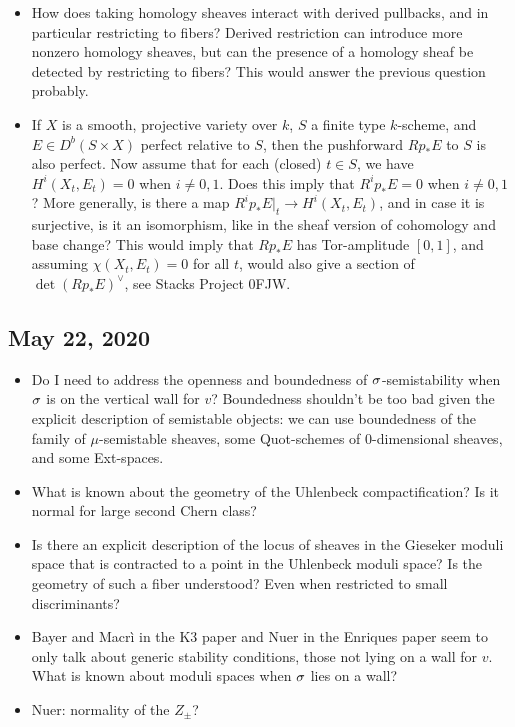 \documentclass[letterpaper,10pt]{article}
\begin{document}
\begin{itemize}
    \item How does taking homology sheaves interact with derived pullbacks, and in particular restricting to fibers? Derived restriction can introduce more nonzero homology sheaves, but can the presence of a homology sheaf be detected by restricting to fibers? This would answer the previous question probably.
    
    \item If $X$ is a smooth, projective variety over $k$, $S$ a finite type $k$-scheme, and $E \in D^b(S \times X)$ perfect relative to $S$, then the pushforward $R p_* E$ to $S$ is also perfect. Now assume that for each (closed) $t \in S$, we have $H^i(X_t, E_t) = 0$ when $i \neq 0,1$. Does this imply that $R^i p_* E = 0$ when $i \neq 0,1$? More generally, is there a map $R^i p_* E\vert_t \to H^i(X_t, E_t)$, and in case it is surjective, is it an isomorphism, like in the sheaf version of cohomology and base change? This would imply that $R p_* E$ has Tor-amplitude $[0,1]$, and assuming $\chi(X_t, E_t) = 0$ for all $t$, would also give a section of $\det(R p_* E)^\vee$, see Stacks Project 0FJW.
    
\end{itemize}

\subsection*{May 22, 2020}
\begin{itemize}
    \item Do I need to address the openness and boundedness of $\sigma$-semistability when $\sigma$ is on the vertical wall for $v$? Boundedness shouldn't be too bad given the explicit description of semistable objects: we can use boundedness of the family of $\mu$-semistable sheaves, some Quot-schemes of 0-dimensional sheaves, and some Ext-spaces.
    
    \item What is known about the geometry of the Uhlenbeck compactification? Is it normal for large second Chern class?
    
    \item Is there an explicit description of the locus of sheaves in the Gieseker moduli space that is contracted to a point in the Uhlenbeck moduli space? Is the geometry of such a fiber understood? Even when restricted to small discriminants?
    
    \item Bayer and Macr\`i in the K3 paper and Nuer in the Enriques paper seem to only talk about generic stability conditions, those not lying on a wall for $v$. What is known about moduli spaces when $\sigma$ lies on a wall?
    
    \item Nuer: normality of the $Z_{\pm}$?
\end{itemize}
\end{document}
